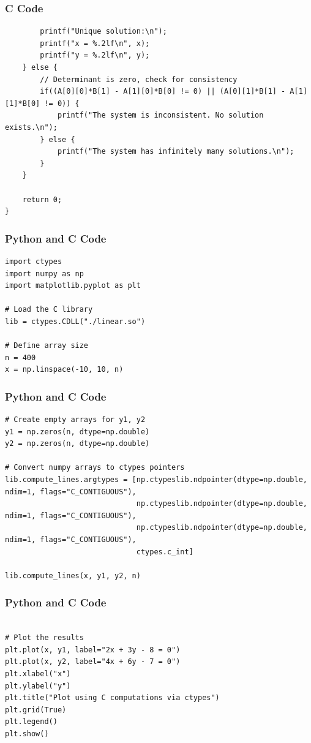 \documentclass{beamer}
\begin{document}
\begin{frame}[fragile]
\frametitle{C Code}
\begin{lstlisting}
        printf("Unique solution:\n");
        printf("x = %.2lf\n", x);
        printf("y = %.2lf\n", y);
    } else {
        // Determinant is zero, check for consistency
        if((A[0][0]*B[1] - A[1][0]*B[0] != 0) || (A[0][1]*B[1] - A[1][1]*B[0] != 0)) {
            printf("The system is inconsistent. No solution exists.\n");
        } else {
            printf("The system has infinitely many solutions.\n");
        }
    }

    return 0;
}
  \end{lstlisting}

\end{frame}


\begin{frame}[fragile]
\frametitle{Python and C Code}

\begin{lstlisting}
import ctypes
import numpy as np
import matplotlib.pyplot as plt

# Load the C library
lib = ctypes.CDLL("./linear.so")

# Define array size
n = 400
x = np.linspace(-10, 10, n)
\end{lstlisting}

\end{frame}


\begin{frame}[fragile]
\frametitle{Python and C Code}

\begin{lstlisting}
# Create empty arrays for y1, y2
y1 = np.zeros(n, dtype=np.double)
y2 = np.zeros(n, dtype=np.double)

# Convert numpy arrays to ctypes pointers
lib.compute_lines.argtypes = [np.ctypeslib.ndpointer(dtype=np.double, ndim=1, flags="C_CONTIGUOUS"),
                              np.ctypeslib.ndpointer(dtype=np.double, ndim=1, flags="C_CONTIGUOUS"),
                              np.ctypeslib.ndpointer(dtype=np.double, ndim=1, flags="C_CONTIGUOUS"),
                              ctypes.c_int]

lib.compute_lines(x, y1, y2, n)
\end{lstlisting}

\end{frame}


\begin{frame}[fragile]
\frametitle{Python and C Code}

\begin{lstlisting}

# Plot the results
plt.plot(x, y1, label="2x + 3y - 8 = 0")
plt.plot(x, y2, label="4x + 6y - 7 = 0")
plt.xlabel("x")
plt.ylabel("y")
plt.title("Plot using C computations via ctypes")
plt.grid(True)
plt.legend()
plt.show()
\end{lstlisting}

\end{frame}
\end{document}
